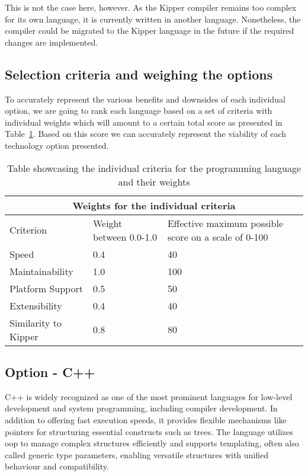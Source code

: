 This is not the case here, however. As the Kipper compiler remains too complex for its own language, it is currently written in another language. Nonetheless, the compiler could be migrated to the Kipper language in the future if the required changes are implemented.

\subsection{Selection criteria and weighing the options}
\label{sec:development-language-selection-criteria}

To accurately represent the various benefits and downsides of each individual option, we are going to rank each language based on a set of criteria with individual weights which will amount to a certain total score as presented in Table~\ref{tab:programming-language-criteria-weights}. Based on this score we can accurately represent the viability of each technology option presented.

\begin{table}[H]
	\centering
	\begin{tabular}{ |p{4cm}|p{5cm}|p{5cm}|  }
		\hline
		\multicolumn{3}{|c|}{Weights for the individual criteria} \\
		\hline
		Criterion&Weight between 0.0-1.0&Effective maximum possible score on a scale of 0-100\\
		\hline
		Speed&0.4&40\\
		Maintainability&1.0&100\\
		Platform Support&0.5&50\\
		Extensibility&0.4&40\\
		Similarity to Kipper&0.8&80\\
		\hline
	\end{tabular}
	\caption{Table showcasing the individual criteria for the programming language and their weights}
	\label{tab:programming-language-criteria-weights}
\end{table}

\subsection{Option - C++}
\label{sec:programming-language-option-c++}

C++ is widely recognized as one of the most prominent languages for low-level development and system programming, including compiler development. In addition to offering fast execution speeds, it provides flexible mechanisms like pointers for structuring essential constructs such as trees. The language utilizes \acrshort{oop} to manage complex structures efficiently and supports templating, often also called generic type parameters, enabling versatile structures with unified behaviour and compatibility.

